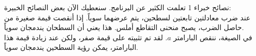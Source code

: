 \begin{surferPage}{نصائح خبراء 1}
تعلمت الكثير عن البرنامج. سنعطيك الآن بعض النصائح الخبيرة:\\
\vspace{0.3cm}
عند ضرب معادلتين تابعتين لسطحين، يتم عرضهما سوياً. إذا أنقصت قيمة صغيرة من حاصل الضرب، يصبح منحنى التقاطع أملس. هذا يعني أن السطحان يندمجان سوياً.\\
\vspace{0.3cm}
في الصيغة، ننقص البارامتر $a$. لقد تم تثبيته على قيمة صفر، ولكن عند زيادة قيمة هذا البارامتر، يمكن رؤية السطحين يندمجان سوياً.
\end{surferPage}
